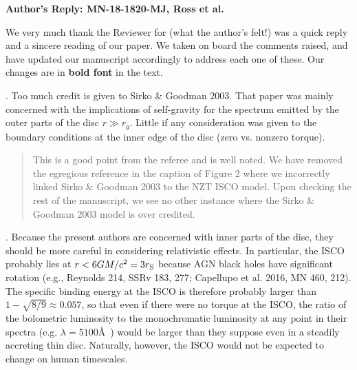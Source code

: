 \documentclass[11pt, a4paper]{article}
\begin{document}
\begin{center}
{\bf Author's Reply: MN-18-1820-MJ, Ross et al.}
\end{center}
\hspace{16pt}

\noindent
We very much thank the Reviewer for (what the author's felt!) was a
quick reply and a sincere reading of our paper. We taken on board the
comments raised, and have updated our manuscript accordingly to
address each one of these. Our changes are in {\bf bold font} in the
text.

\medskip
\medskip
{}. Too much credit is given to Sirko \& Goodman 2003. That paper was
mainly concerned with the implications of self-gravity for the
spectrum emitted by the outer parts of the disc $r \gg r_{g}$. Little
if any consideration was given to the boundary conditions at the inner
edge of the disc (zero vs. nonzero torque). 

\begin{quote}
This is a good point from the referee and is well noted. We have 
removed the egregious reference in the caption of Figure 2 where 
we incorrectly linked Sirko \& Goodman 2003 to the NZT ISCO model. 
Upon checking the rest of the manuscript, we see no other instance 
where the Sirko \& Goodman 2003 model is over credited. 


\end{quote}


. Because the present authors are concerned with inner parts of the
disc, they should be more careful in considering relativistic
effects. In particular, the ISCO probably lies at $r < 6GM/c^{2} =
3r_{\rm S}$ because AGN black holes have significant rotation (e.g.,
Reynolds 214, SSRv 183, 277; Capellupo et al. 2016, MN 460, 212). The
specific binding energy at the ISCO is therefore probably larger than
$1 - \sqrt{8/9} \approx 0.057$, so that even if there were no torque
at the ISCO, the ratio of the bolometric luminosity to the
monochromatic luminosity at any point in their spectra (e.g. $\lambda
= 5100$\AA\ ) would be larger than they suppose even in a steadily
accreting thin disc. Naturally, however, the ISCO would not be
expected to change on human timescales.
\end{document}
